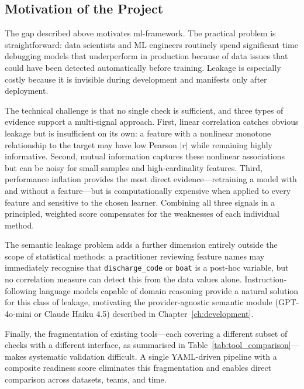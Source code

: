 \documentclass[12pt,a4paper]{report}
\begin{document}
\subsection{Motivation of the Project}

The gap described above motivates ml-framework.  The practical problem is straightforward:
data scientists and ML engineers routinely spend significant time debugging models that
underperform in production because of data issues that could have been detected automatically
before training.  Leakage is especially costly because it is invisible during development and
manifests only after deployment.

The technical challenge is that no single check is sufficient, and three types of evidence
support a multi-signal approach.  First, linear correlation catches obvious leakage but is
insufficient on its own: a feature with a nonlinear monotone relationship to the target may
have low Pearson $|r|$ while remaining highly informative.  Second, mutual information
captures these nonlinear associations but can be noisy for small samples and high-cardinality
features.  Third, performance inflation provides the most direct evidence---retraining a model
with and without a feature---but is computationally expensive when applied to every feature and
sensitive to the chosen learner.  Combining all three signals in a principled, weighted score
compensates for the weaknesses of each individual method.

The semantic leakage problem adds a further dimension entirely outside the scope of statistical
methods: a practitioner reviewing feature names may immediately recognise that
\texttt{discharge\_code} or \texttt{boat} is a post-hoc variable, but no correlation measure can
detect this from the data values alone.  Instruction-following language models capable of
domain reasoning provide a natural solution for this class of leakage, motivating the
provider-agnostic semantic module (GPT-4o-mini or Claude Haiku 4.5) described in
Chapter~\ref{ch:development}.

Finally, the fragmentation of existing tools---each covering a different subset of checks with
a different interface, as summarised in Table~\ref{tab:tool_comparison}---makes systematic
validation difficult.  A single YAML-driven pipeline with a composite readiness score
eliminates this fragmentation and enables direct comparison across datasets, teams, and time.
\end{document}
